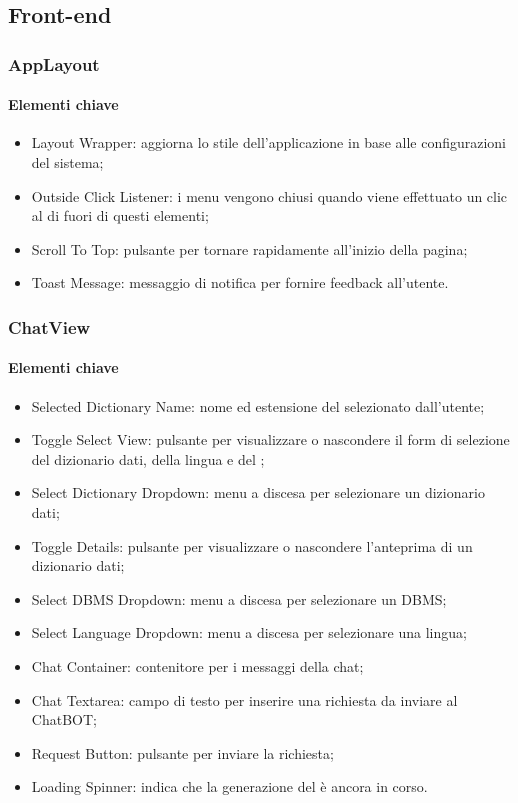 \subsection{Front-end}

\subsubsection{AppLayout}

\paragraph*{Elementi chiave}
\begin{itemize}
  \item Layout Wrapper: aggiorna lo stile dell'applicazione in base alle configurazioni del sistema;
  \item Outside Click Listener: i menu vengono chiusi quando viene effettuato un clic al di fuori di questi elementi;
  \item Scroll To Top: pulsante per tornare rapidamente all'inizio della pagina;
  \item Toast Message: messaggio di notifica per fornire feedback all'utente.
\end{itemize}

\subsubsection{ChatView}

\paragraph*{Elementi chiave}
\begin{itemize}
  \item Selected Dictionary Name: nome ed estensione del  selezionato dall'utente;
  \item Toggle Select View: pulsante per visualizzare o nascondere il form di selezione del dizionario dati, della lingua e del ;
  \item Select Dictionary Dropdown: menu a discesa per selezionare un dizionario dati;
  \item Toggle Details: pulsante per visualizzare o nascondere l'anteprima di un dizionario dati;
  \item Select DBMS Dropdown: menu a discesa per selezionare un DBMS;
  \item Select Language Dropdown: menu a discesa per selezionare una lingua;
  \item Chat Container: contenitore per i messaggi della chat;
  \item Chat Textarea: campo di testo per inserire una richiesta da inviare al ChatBOT;
  \item Request Button: pulsante per inviare la richiesta;
  \item Loading Spinner: indica che la generazione del  è ancora in corso.
\end{itemize}


